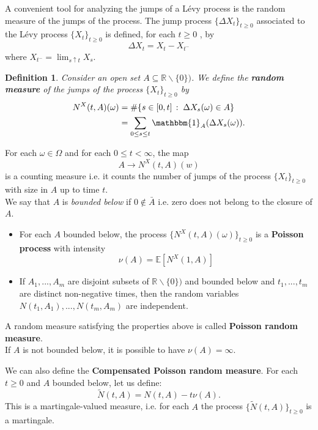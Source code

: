 \documentclass[a4paper,10pt]{article}
\newcommand{\numberset}{\mathbb}
\newcommand{\R}{\numberset{R}}
\newtheorem{Definition}{Definition}[section]
\begin{document}
A convenient tool for analyzing the jumps of a Lévy process is the random
measure of the jumps of the process.
The jump process $\{\Delta X_t\}_{t \ge 0}$ associated to the Lévy process $\{X_t\}_{t \ge 0}$ is
defined, for each $t \geq 0$ , by
\begin{equation}\label{jump}
 \Delta X_t = X_t - X_{t^-}
\end{equation}
where $X_{t^-} = \lim_{s\uparrow t} X_s $.\\ 
\begin{Definition}
Consider an open set $A \subseteq \R \backslash \{ 0 \})$.
We define the \textbf{random measure} of the jumps of the process $\{X_t\}_{t \ge 0}$ by
\begin{align}
 N^X(t,A)(\omega) &= \# \{ s \in [0,t] \, : \; \Delta X_s(\omega) \in A  \} \\
		   &= \sum_{0 \leq s \leq t} \mathbbm{1}_A(\Delta X_s(\omega)) . \nonumber
\end{align} 
\end{Definition}
\noindent
For each $\omega \in \Omega$ and for each $0 \leq t < \infty$, the map 
$$ A \to N^X(t,A)(w) $$ 
is a counting measure i.e. it counts the number of jumps of the process $\{X_t\}_{t\geq0}$ with size in $A$ up to time $t$.\\
We say that $A$ is \emph{bounded below} if $0 \not \in \bar A$ i.e. zero does not belong to the closure of $A$. 

\begin{itemize}
 \item For each $A$ bounded below, the process $\bigl \{ N^X(t,A)(\omega) \bigr \}_{t\geq 0}$ is a \textbf{Poisson process} with intensity 
 \begin{equation}\label{Expect_N}
 \nu(A) = \mathbb{E}[N^X(1,A) ] 
 \end{equation}
 \item If $A_1, ..., A_m$ are disjoint subsets of $\R \backslash \{ 0 \})$ and bounded below and $t_1, ..., t_m$ are distinct non-negative times, then
 the random variables $N(t_1,A_1), ..., N(t_m,A_m)$ are independent.
\end{itemize}
A random measure satisfying the properties above is called \textbf{Poisson random measure}.\\
If $A$ is not bounded below, it is possible to have $\nu(A) = \infty$. 

We can also define the \textbf{Compensated Poisson random measure}. For each $t \geq 0$ and $A$ bounded below, let us define: 
\begin{equation}
 \tilde{N}(t,A) = N(t,A) - t\nu(A). 
\end{equation}
This is a martingale-valued measure, i.e. for each $A$ the process $\bigl \{ \tilde{N}(t,A) \bigr \}_{t\geq 0} $ is a martingale.  
\end{document}
